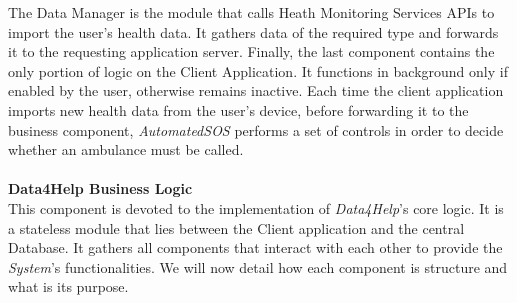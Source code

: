 \documentclass[titlepage]{article}
\begin{document}
The Data Manager is the module that calls Heath Monitoring Services APIs to import the user’s health data. It gathers data of the required type and forwards it to the requesting application server.
Finally, the last component contains the only portion of logic on the Client Application. It functions in background only if enabled by the user, otherwise remains inactive. Each time the client application imports new health data from the user’s device, before forwarding it to the business component, {\it AutomatedSOS} performs a set of controls in order to decide whether an ambulance must be called. \\ \\
{\bf Data4Help Business Logic }\\ 
This component is devoted to the implementation of {\it Data4Help}’s core logic. It is a stateless module that lies between the Client application and the central Database. It gathers all components that interact with each other to provide the {\it System}’s functionalities. We will now detail how each component is structure and what is its purpose.
\end{document}
